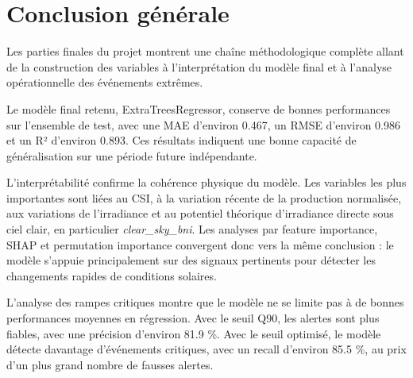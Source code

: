 \chapter{Conclusion générale}

Les parties finales du projet montrent une chaîne méthodologique complète allant de la construction des variables à l'interprétation du modèle final et à l'analyse opérationnelle des événements extrêmes.

Le modèle final retenu, ExtraTreesRegressor, conserve de bonnes performances sur l'ensemble de test, avec une MAE d'environ 0.467, un RMSE d'environ 0.986 et un R² d'environ 0.893. Ces résultats indiquent une bonne capacité de généralisation sur une période future indépendante.

L'interprétabilité confirme la cohérence physique du modèle. Les variables les plus importantes sont liées au CSI, à la variation récente de la production normalisée, aux variations de l'irradiance et au potentiel théorique d'irradiance directe sous ciel clair, en particulier \textit{clear\_sky\_bni}. Les analyses par feature importance, SHAP et permutation importance convergent donc vers la même conclusion : le modèle s'appuie principalement sur des signaux pertinents pour détecter les changements rapides de conditions solaires.

L'analyse des rampes critiques montre que le modèle ne se limite pas à de bonnes performances moyennes en régression. Avec le seuil Q90, les alertes sont plus fiables, avec une précision d'environ 81.9 \%. Avec le seuil optimisé, le modèle détecte davantage d'événements critiques, avec un recall d'environ 85.5 \%, au prix d'un plus grand nombre de fausses alertes.
